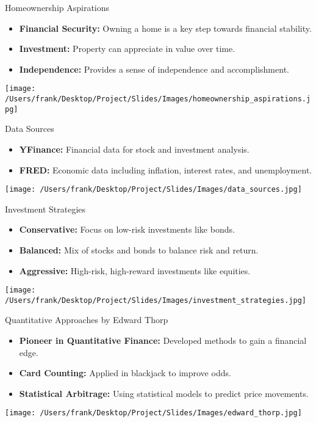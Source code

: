 \documentclass{beamer}
\begin{document}
\begin{frame}{Homeownership Aspirations}
    \begin{itemize}
        \item \textbf{Financial Security:} Owning a home is a key step towards financial stability.
        \item \textbf{Investment:} Property can appreciate in value over time.
        \item \textbf{Independence:} Provides a sense of independence and accomplishment.
    \end{itemize}
    \centering
    \texttt{[image: /Users/frank/Desktop/Project/Slides/Images/homeownership\_aspirations.jpg]}
\end{frame}

\begin{frame}{Data Sources}
    \begin{itemize}
        \item \textbf{YFinance:} Financial data for stock and investment analysis.
        \item \textbf{FRED:} Economic data including inflation, interest rates, and unemployment.
    \end{itemize}
    \centering
    \texttt{[image: /Users/frank/Desktop/Project/Slides/Images/data\_sources.jpg]}
\end{frame}

\begin{frame}{Investment Strategies}
    \begin{itemize}
        \item \textbf{Conservative:} Focus on low-risk investments like bonds.
        \item \textbf{Balanced:} Mix of stocks and bonds to balance risk and return.
        \item \textbf{Aggressive:} High-risk, high-reward investments like equities.
    \end{itemize}
    \centering
    \texttt{[image: /Users/frank/Desktop/Project/Slides/Images/investment\_strategies.jpg]}
\end{frame}

\begin{frame}{Quantitative Approaches by Edward Thorp}
    \begin{itemize}
        \item \textbf{Pioneer in Quantitative Finance:} Developed methods to gain a financial edge.
        \item \textbf{Card Counting:} Applied in blackjack to improve odds.
        \item \textbf{Statistical Arbitrage:} Using statistical models to predict price movements.
    \end{itemize}
    \centering
    \texttt{[image: /Users/frank/Desktop/Project/Slides/Images/edward\_thorp.jpg]}
\end{frame}
\end{document}
